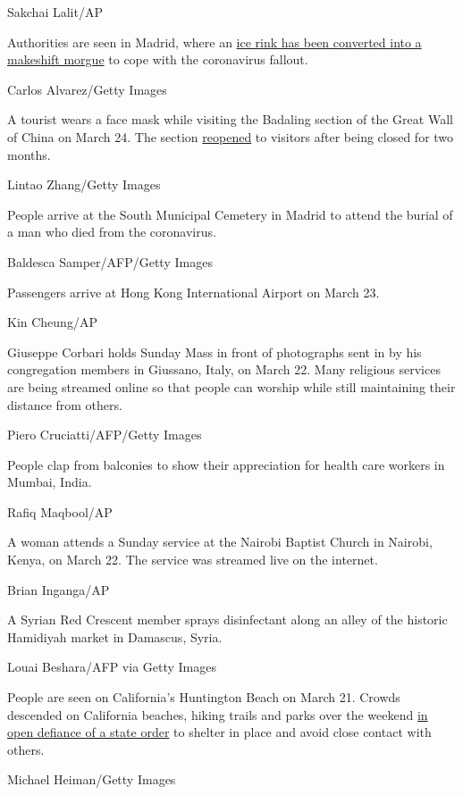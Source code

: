 Sakchai Lalit/AP

Authorities are seen in Madrid, where an
\href{https://edition.cnn.com/2020/03/24/europe/spain-ice-rink-morgue-coronavirus-intl/index.html}{ice
rink has been converted into a makeshift morgue} to cope with the
coronavirus fallout.

Carlos Alvarez/Getty Images

A tourist wears a face mask while visiting the Badaling section of the
Great Wall of China on March 24. The section
\href{https://www.cnn.com/travel/article/badaling-great-wall-china-reopens-intl-hnk/index.html}{reopened}
to visitors after being closed for two months.

Lintao Zhang/Getty Images

People arrive at the South Municipal Cemetery in Madrid to attend the
burial of a man who died from the coronavirus.

Baldesca Samper/AFP/Getty Images

Passengers arrive at Hong Kong International Airport on March 23.

Kin Cheung/AP

Giuseppe Corbari holds Sunday Mass in front of photographs sent in by
his congregation members in Giussano, Italy, on March 22. Many religious
services are being streamed online so that people can worship while
still maintaining their distance from others.

Piero Cruciatti/AFP/Getty Images

People clap from balconies to show their appreciation for health care
workers in Mumbai, India.

Rafiq Maqbool/AP

A woman attends a Sunday service at the Nairobi Baptist Church in
Nairobi, Kenya, on March 22. The service was streamed live on the
internet.

Brian Inganga/AP

A Syrian Red Crescent member sprays disinfectant along an alley of the
historic Hamidiyah market in Damascus, Syria.

Louai Beshara/AFP via Getty Images

People are seen on California's Huntington Beach on March 21. Crowds
descended on California beaches, hiking trails and parks over the
weekend
\href{https://www.cnn.com/2020/03/23/us/california-stay-at-home-beach-goers/index.html}{in
open defiance of a state order} to shelter in place and avoid close
contact with others.

Michael Heiman/Getty Images

